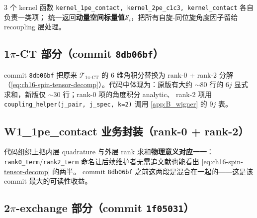

3 个 kernel 函数 \texttt{kernel\_1pe\_contact, kernel\_2pe\_c1c3, kernel\_contact} 各自负责一类项；
统一返回\textbf{动量空间标量值}\(\mathcal{S}_i\)，把所有自旋-同位旋角度因子留给 recoupling 层处理。

\subsection{1\(\pi\)-CT 部分（commit \texttt{8db06bf}）}



commit \texttt{8db06bf} 把原来 \(\mathcal{T}_{1\pi\text{-CT}}\) 的 6 维角积分替换为
rank-0 + rank-2 分解（\cref{eq:ch16-spin-tensor-decomp}）。代码中体现为：原版有大约
\(\sim 80\) 行的 6\(j\) 显式求和，新版仅 \(\sim 30\) 行；rank-0 项的角度积分 analytic、
rank-2 项用 \texttt{coupling\_helper(j\_pair, j\_spec, k=2)} 调用 \cref{app:B_wigner} 的 9\(j\) 表。

\subsection{W1\_1pe\_contact 业务封装（rank-0 + rank-2）}



代码组织上把内层 quadrature 与外层 rank 求和\textbf{物理意义对应一一}：
\texttt{rank0\_term}/\texttt{rank2\_term} 命名让后续维护者无需追文献也能看出 \cref{eq:ch16-spin-tensor-decomp} 的两半。
commit \texttt{8db06bf} 之前这两段是混合在一起的——这是该 commit 最大的可读性收益。

\subsection{2\(\pi\)-exchange 部分（commit \texttt{1f05031}）}



